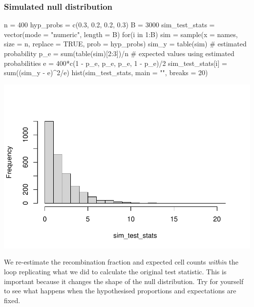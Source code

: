 \documentclass[a4paper]{article}\usepackage[]{graphicx}\usepackage[]{xcolor}
\makeatletter
\def\maxwidth{ %
  \ifdim\Gin@nat@width>\linewidth
    \linewidth
  \else
    \Gin@nat@width
  \fi
}
\makeatother
\begin{document}
\subsubsection{Simulated null distribution}
\begin{Schunk}
\begin{Sinput}
n = 400
hyp_probs = c(0.3, 0.2, 0.2, 0.3)
B = 3000
sim_test_stats = vector(mode = "numeric", length = B)
for(i in 1:B){
  sim = sample(x = names, size = n, replace = TRUE, prob = hyp_probs)
  sim_y = table(sim)
  # estimated probability
  p_e = sum(table(sim)[2:3])/n
  # expected values using estimated probabilities
  e = 400*c(1 - p_e, p_e, p_e, 1 - p_e)/2
  sim_test_stats[i] = sum((sim_y - e)^2/e)
}
hist(sim_test_stats, main = "", breaks = 20)
\end{Sinput}


{\centering \includegraphics[width=\maxwidth]{figure/listings-unnamed-chunk-27-1} 

}

\end{Schunk}
\begin{goldbox}
	We re-estimate the recombination fraction and expected cell counts \textit{within} the loop replicating what we did to calculate the original test statistic. This is important because it changes the shape of the null distribution. Try for yourself to see what happens when the hypothesised proportions and expectations are fixed.
\end{goldbox}
\end{document}
